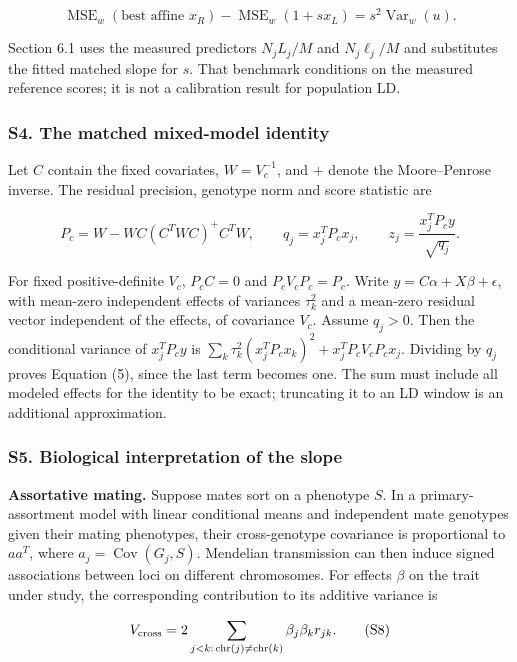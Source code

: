 \documentclass[11pt,a4paper]{article}
\begin{document}
\[
\operatorname{MSE}_w(\text{best affine }x_R)
-\operatorname{MSE}_w(1+sx_L)=s^2\operatorname{Var}_w(u). \tag{S6}
\]

Section 6.1 uses the measured predictors \(N_jL_j/M\) and \(N_j\ell_j/M\) and substitutes the fitted matched slope for \(s\). That benchmark conditions on the measured reference scores; it is not a calibration result for population LD.

\subsubsection{S4. The matched mixed-model identity}\label{s4-the-matched-mixed-model-identity}

Let \(C\) contain the fixed covariates, \(W=V_c^{-1}\), and \(+\) denote the Moore--Penrose inverse. The residual precision, genotype norm and score statistic are

\[
P_c=W-WC(C^TWC)^+C^TW,\qquad q_j=x_j^TP_cx_j,\qquad
z_j=\frac{x_j^TP_c y}{\sqrt{q_j}}. \tag{S7}
\]

For fixed positive-definite \(V_c\), \(P_cC=0\) and \(P_cV_cP_c=P_c\). Write \(y=C\alpha+X\beta+\epsilon\), with mean-zero independent effects of variances \(\tau_k^2\) and a mean-zero residual vector independent of the effects, of covariance \(V_c\). Assume \(q_j>0\). Then the conditional variance of \(x_j^TP_cy\) is \(\sum_k\tau_k^2(x_j^TP_cx_k)^2+x_j^TP_cV_cP_cx_j\). Dividing by \(q_j\) proves Equation (5), since the last term becomes one. The sum must include all modeled effects for the identity to be exact; truncating it to an LD window is an additional approximation.

\subsubsection{S5. Biological interpretation of the slope}\label{s5-biological-interpretation-of-the-slope}

\textbf{Assortative mating.} Suppose mates sort on a phenotype \(S\). In a primary-assortment model with linear conditional means and independent mate genotypes given their mating phenotypes, their cross-genotype covariance is proportional to \(a a^T\), where \(a_j=\operatorname{Cov}(G_j,S)\). Mendelian transmission can then induce signed associations between loci on different chromosomes. For effects \(\beta\) on the trait under study, the corresponding contribution to its additive variance is

\[
V_{\rm cross}=2\sum_{j<k:\,{\rm chr}(j)\ne{\rm chr}(k)}
                      \beta_j\beta_k r_{jk}. \tag{S8}
\]
\end{document}
